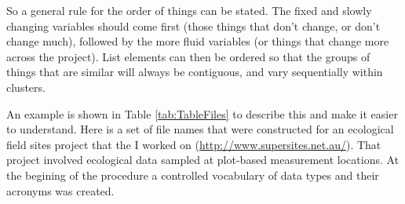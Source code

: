 \documentclass[11pt,a4paper]{article}
\begin{document}
So a general rule for the order of things can be stated. The fixed and
slowly changing variables should come first (those things that don't
change, or don't change much), followed by the more fluid variables (or
things that change more across the project). List elements can then be
ordered so that the groups of things that are similar will always be
contiguous, and vary sequentially within clusters.

An example is shown in Table \ref{tab:TableFiles} to describe this and
make it easier to understand. Here is a set of file names that were
constructed for an ecological field sites project that the I worked on
(\href{http://www.supersites.net.au/}{\url{http://www.supersites.net.au/}}).
That project involved ecological data sampled at plot-based measurement
locations. At the begining of the procedure a controlled vocabulary of
data types and their acronyms was created.
\end{document}
